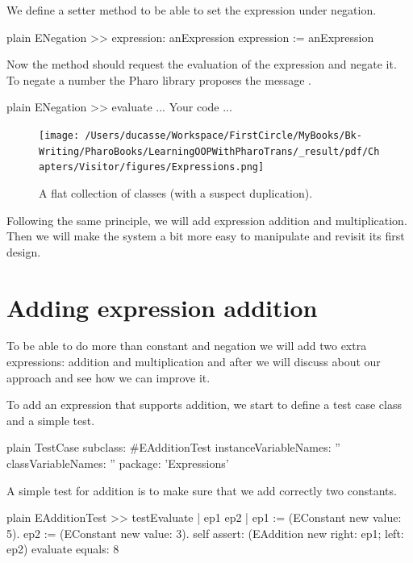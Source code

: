\documentclass[10pt,twoside,english]{_support/latex/sbabook/sbabook}
\begin{document}
We define a setter method to be able to set the expression under negation.

\begin{displaycode}{plain}
ENegation >> expression: anExpression 
	expression := anExpression
\end{displaycode}

Now the  method should request the evaluation of the expression and negate it. 
To negate a number the Pharo library proposes the message . 

\begin{displaycode}{plain}
ENegation >> evaluate
	... Your code ...
\end{displaycode}


\begin{figure}

\begin{center}
\texttt{[image: /Users/ducasse/Workspace/FirstCircle/MyBooks/Bk-Writing/PharoBooks/LearningOOPWithPharoTrans/\_result/pdf/Chapters/Visitor/figures/Expressions.png]}\caption{A flat collection of classes (with a suspect duplication).\label{figExpression}}\end{center}
\end{figure}


Following the same principle, we will add expression addition and multiplication. Then we will make the system a bit more easy to manipulate and revisit its first design. 
\section{Adding expression addition}
To be able to do more than constant and negation we will add two extra expressions: addition and multiplication and after we will discuss about our approach and see how we can improve it.  

To add an expression that supports addition, we start to define a test case class and a simple test. 

\begin{displaycode}{plain}
TestCase subclass: #EAdditionTest
	instanceVariableNames: ''
	classVariableNames: ''
	package: 'Expressions'
\end{displaycode}

A simple test for addition is to make sure that we add correctly two constants. 

\begin{displaycode}{plain}
EAdditionTest >> testEvaluate
	| ep1 ep2 |
	ep1 := (EConstant new value: 5).
	ep2 := (EConstant new value: 3).
	self assert: (EAddition new right: ep1; left: ep2) evaluate equals: 8
\end{displaycode}
\end{document}
